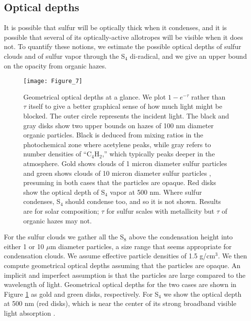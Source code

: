 \documentclass[preprint]{aastex6}
\begin{document}
\subsection{Optical depths}

It is possible that sulfur will be optically thick when it condenses,
and it is possible that several of its optically-active allotropes will be visible when it does not.
{\color{red} To quantify these notions, we estimate the possible optical depths of sulfur clouds and of sulfur vapor through the S$_4$ di-radical,
and we give an upper bound on the opacity from organic hazes.}

  \begin{figure}[!htb] 
   \centering
   \texttt{[image: Figure\_7]} 
   \caption{\small {\color{red} Geometrical }optical depths at a glance. 
   We plot $1-e^{-\tau}$ rather than $\tau$ itself to give a better graphical
   sense of how much light {\color{red} might be} blocked.  The outer circle represents the incident light.
   The black and gray disks show two upper bounds on {\color{red} hazes} of 100 nm diameter organic particles.
   Black is deduced from mixing ratios in the photochemical
   zone where acetylene peaks, while gray refers to number densities of ``C$_4$H$_2$,'' which typically peaks deeper in the atmosphere. 
   Gold shows clouds of 1 micron diameter sulfur particles and green
   shows clouds of 10 micron diameter sulfur particles {\color{red}, presuming in both cases that the particles are opaque.}
   Red disks show the optical depth of S$_4$ vapor at 500 nm.
   Where sulfur condenses, S$_4$ should condense too, and so it is not shown.  
   Results are for solar composition; $\tau$ for sulfur scales with metallicity but $\tau$ of organic hazes may not.
    }
\label{optical depth}
\end{figure}

For the sulfur clouds we gather all the S$_8$ above the condensation height into either 1 or 10 $\mu$m diameter particles,
a size range that seems appropriate for condensation clouds.
We assume effective particle densities of 1.5 g/cm$^3$. 
{\color{red} We then compute geometrical optical depths assuming that the particles are opaque.
An implicit and imperfect assumption is that the particles are large compared to the wavelength of light.
Geometrical optical depths for the two cases are shown} in Figure \ref{optical depth} as gold and green disks, respectively.
For S$_4$ we show the optical depth at 500 nm (red disks), which is near the center of its strong broadband visible light absorption \citep{Meyer1976}.
\end{document}
